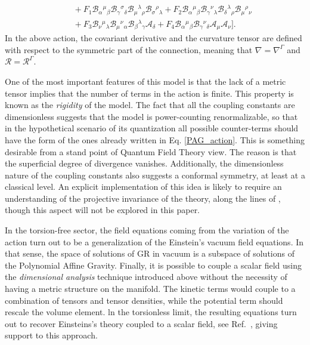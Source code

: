 \documentclass[epj]{svjour}
\begin{document}
\begin{equation}
\begin{split}
    \\
    & \quad
    + F_1 \mathcal{B}_{\alpha}{}^{\mu}{}_{\beta} \mathcal{B}_{\gamma}{}^{\sigma}{}_{\delta} \mathcal{B}_{\mu}{}^{\lambda}{}_{\rho} \mathcal{B}_{\sigma}{}^{\rho}{}_{\lambda}
    + F_2\mathcal{B}_{\alpha}{}^{\mu}{}_{\beta} \mathcal{B}_{\gamma}{}^{\nu}{}_{\lambda} \mathcal{B}_{\delta}{}^{\lambda}{}_{\rho} \mathcal{B}_{\mu}{}^{\rho}{}_{\nu}
    \\
    &\quad
    + F_3 \mathcal{B}_{\nu}{}^{\mu}{}_{\lambda} \mathcal{B}_{\mu}{}^{\nu}{}_{\alpha} \mathcal{B}_{\beta}{}^{\lambda}{}_{\gamma} \mathcal{A}_\delta
    + F_4 \mathcal{B}_{\alpha}{}^{\mu}{}_{\beta}\mathcal{B}_{\gamma}{}^{\nu}{}_{\delta}\mathcal{A}_\mu \mathcal{A}_\nu \bigg].
    \end{split}
\end{equation}
In the above action, the covariant derivative and the curvature tensor are defined
with respect to the symmetric part of the connection, meaning that $\nabla = \nabla^{\Gamma}$ 
and $\mathcal{R} = \mathcal{R}^{\Gamma}$. 

One of the most important features of this model is that the lack of a metric tensor  implies that the number of terms in the action is finite. This property is known as the \textit{rigidity} of the model.
The fact that all the coupling constants are dimensionless  suggests that the model is power-counting renormalizable, so that in the hypothetical scenario of its quantization all possible counter-terms should have the form of the ones already written in Eq. \eqref{PAG_action}.  This is something desirable from a stand point of Quantum Field Theory view. The reason is that the superficial degree of divergence vanishes. Additionally, the dimensionless nature of the coupling constants also suggests a conformal symmetry, at least at a classical level. An explicit implementation of this idea is likely to require an understanding of the projective invariance of the theory, along the lines of \cite{Olmo:2022ops}, though this aspect will not be explored in this paper. 

In the torsion-free sector, the field equations coming from the variation of the action turn out to be a generalization of the Einstein's vacuum field equations. In that sense, the space of solutions of GR in vacuum is a subspace of solutions of the Polynomial Affine Gravity. 
Finally, it is possible to couple a scalar field using the \textit{dimensional analysis} technique introduced above without the necessity of having a metric structure on the manifold. The kinetic terms would couple to a combination of tensors and tensor densities, while the potential term should rescale the volume element. ln the torsionless limit, the resulting equations turn out to recover Einsteins's theory coupled to a scalar field, see Ref.~\cite{castillofelisola2023inflationary}, giving support to this approach.
\end{document}
